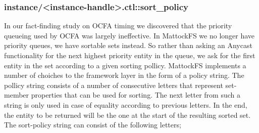 \subsubsection{instance/<instance-handle>.ctl::sort\_policy}
In our fact-finding study on OCFA timing we discovered that the priority queueing used by OCFA was largely ineffective. In MattockFS we no longer have priority queues, we have sortable sets instead. So rather than asking an Anycast functionality for the next highest priority entity in the queue, we ask for the first entity in the set according to a given sorting pollicy. MattockFS implements a number of choiches to the framework layer in the form of a policy string. The pollicy string consists of a number of consecutive letters that represent set-member properties that can be used for sorting. The next letter from such a string is only used in case of equality according to previous letters. In the end, the entity to be returned will be the one at the start of the resulting sorted set. The sort-policy string can consist of the following letters;
